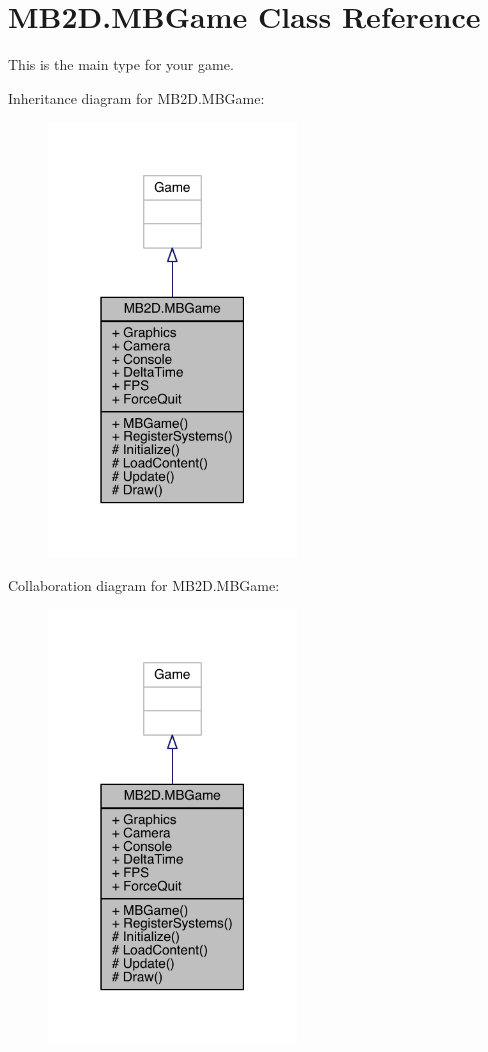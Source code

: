\hypertarget{class_m_b2_d_1_1_m_b_game}{}\section{M\+B2\+D.\+M\+B\+Game Class Reference}
\label{class_m_b2_d_1_1_m_b_game}


This is the main type for your game.  




Inheritance diagram for M\+B2\+D.\+M\+B\+Game\+:\nopagebreak
\begin{figure}[H]
\begin{center}
\leavevmode
\includegraphics[width=187pt]{class_m_b2_d_1_1_m_b_game__inherit__graph}
\end{center}
\end{figure}


Collaboration diagram for M\+B2\+D.\+M\+B\+Game\+:\nopagebreak
\begin{figure}[H]
\begin{center}
\leavevmode
\includegraphics[width=187pt]{class_m_b2_d_1_1_m_b_game__coll__graph}
\end{center}
\end{figure}
